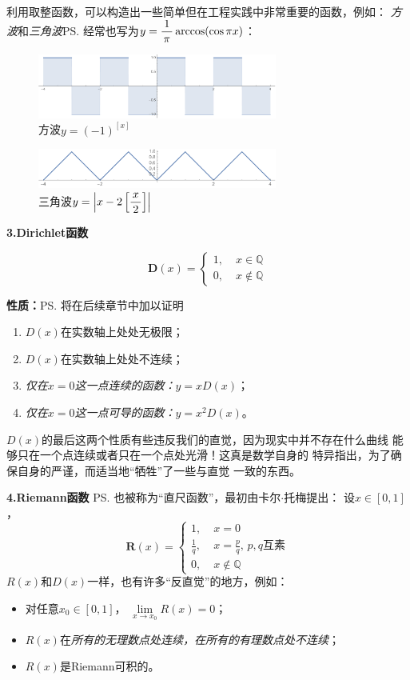 \bs
利用取整函数，可以构造出一些简单但在工程实践中非常重要的函数，例如：
{\it 方波}和{\it 三角波}\ps{经常也写为$y=\displaystyle\frac{\,{1}\,}{\,{\pi}\,}\arccos(\cos\pi x)$}：
\begin{figure}[h]
	\centering
	\includegraphics[width=0.7\textwidth]{./images/ch01/rectWave.pdf}
	\caption{方波$y=(-1)^{[x]}$}
	\label{fig:rectWave}
\end{figure}
\begin{figure}[h]
	\centering
	\includegraphics[width=0.7\textwidth]{./images/ch01/triWave.pdf}
	\caption{三角波$y=\left|x-2\left[\displaystyle\frac{\,{x}\,}{\,{2}\,}\right]\right|$}
	\label{fig:triWave}
\end{figure}

\bs

{\bf 3.Dirichlet函数}

  $$\bm{D}(x) =\left\{
  \begin{array}{ll}
  	1,\;& x\in\mathbb{Q} \\
  	0,\;& x\notin\mathbb{Q}
  \end{array}
  \right.$$

  {\bf 性质：}\ps{将在后续章节中加以证明}
  \begin{enumerate}[(1)]
    \setlength{\itemindent}{1cm}
    \item $D(x)$在实数轴上处处无极限；
	\item $D(x)$在实数轴上处处不连续；
	\item {\it 仅在$x=0$这一点连续的函数：}$y=xD(x)$；
	\item {\it 仅在$x=0$这一点可导的函数：}$y=x^2D(x)$。
  \end{enumerate}

$D(x)$的最后这两个性质有些违反我们的直觉，因为现实中并不存在什么曲线
能够只在一个点连续或者只在一个点处光滑！这真是数学自身的
特异指出，为了确保自身的严谨，而适当地“牺牲”了一些与直觉
一致的东西。

\bs

{\bf 4.Riemann函数} \ps{也被称为“直尺函数”，最初由卡尔$\cdot$托梅提出}：
设$x\in[0,1]$，
  $$\bm{R}(x) =\left\{
	\begin{array}{ll}
	1,\;&x=0\\
	\displaystyle\frac 1q,\;&x=\displaystyle\frac pq,\,p,q\mbox{互素}\\
	0,\;&x\notin\mathbb{Q}
	\end{array}
  \right. $$
$R(x)$和$D(x)$一样，也有许多“反直觉”的地方，例如：
\begin{itemize}
	\item 对任意$x_0\in[0,1]$， $\lim\limits_{x\to x_0}R(x)=0$；
	\item $R(x)$在{\it 所有的无理数点处连续，在所有的有理数点处不连续}；
	\item $R(x)$是Riemann可积的。
\end{itemize}

